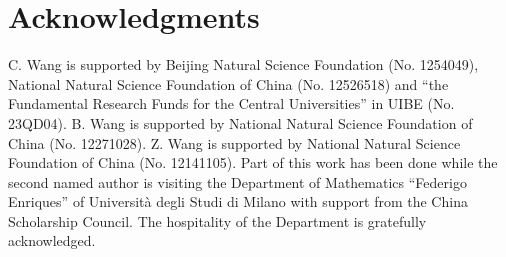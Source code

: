 \documentclass[reqno]{amsart}
\theoremstyle{remark}
\theoremstyle{definition}
\numberwithin{equation}{section}
\begin{document}
\section*{Acknowledgments}
C. Wang is supported by Beijing Natural Science Foundation (No. 1254049), National Natural Science Foundation of China (No. 12526518) and ``the Fundamental Research Funds for the Central Universities'' in UIBE (No. 23QD04). B. Wang is supported by National Natural Science Foundation of China (No. 12271028).  Z. Wang is supported by National Natural Science Foundation of China (No. 12141105). Part of this work has been done while the second named author is visiting the Department of Mathematics ``Federigo Enriques'' of Universit\`{a} degli Studi di Milano with support from the China Scholarship Council. The hospitality of the Department is gratefully acknowledged.
\end{document}
